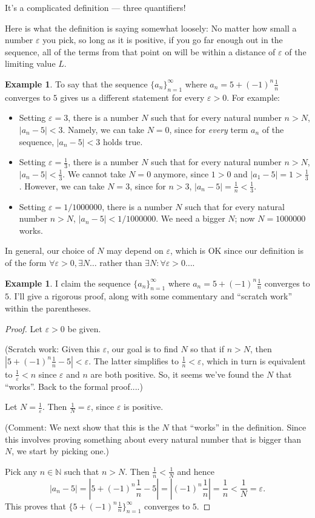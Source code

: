 \documentclass[12pt]{amsart}
\def\e{\varepsilon}
\newcommand{\N}{\mathbb{N}}
\numberwithin{equation}{section}
\theoremstyle{plain} %
\theoremstyle{definition}
\newtheorem{ex}[equation]{Example}
\theoremstyle{remark}
\begin{document}
It's a complicated definition --- three quantifiers!


Here is what the definition is saying somewhat loosely: No matter how small a number $\e$ you pick, so long as it is positive, if you go far enough out in the sequence, all of
the terms from that point on will be within a distance of $\e$ of the limiting value $L$.

\begin{ex} To say that the sequence $\{a_n\}_{n=1}^\infty$ where $a_n =  5 + (-1)^n \frac{1}{n}$ converges to $5$ gives us a different statement for every $\e>0$. For example:
\begin{itemize}
\item Setting $\e=3$, there is a number $N$ such that for every natural number $n>N$, $|a_n-5|<3$. Namely, we can take $N=0$, since for \emph{every} term $a_n$ of the sequence, $|a_n-5|<3$ holds true.
\item Setting $\e=\frac13$, there is a number $N$ such that for every natural number $n>N$, $|a_n-5|<\frac13$. We cannot take $N=0$ anymore, since $1>0$ and $|a_1-5|=1>\frac13$. However, we can take $N=3$, since for $n>3$, $|a_n-5|=\frac1n <\frac13$.
\item Setting $\e=1/1000000$, there is a number $N$ such that for every natural number $n>N$, $|a_n-5|<1/1000000$. We need a bigger $N$; now $N=1000000$ works.
\end{itemize}

In general, our choice of $N$ may depend on $\e$, which is OK since our definition is of the form $\forall \e>0,\exists N\dots$ rather than $\exists N:\forall \e>0\dots$.
\end{ex}



\begin{ex} I claim the sequence $\{a_n\}_{n=1}^\infty$ where $a_n =  5 + (-1)^n \frac{1}{n}$ converges to $5$. I'll give a rigorous proof, along with some commentary and
  ``scratch work'' within the parentheses. 

\begin{proof} Let $\e > 0$ be given. 

(Scratch work: Given this $\e$, our goal is to find $N$ so that if $n > N$, then 
$|5 + (-1)^n \frac{1}{n} - 5| < \e$. The latter simplifies to
$\frac{1}{n} < \e$, which in turn is equivalent to $\frac{1}{\e} < n$ since
$\e$ and $n$ are both positive.  So, it seems we've found the $N$ that
``works''. Back to the formal proof....)


Let $N = \frac{1}{\e}$. Then $\frac{1}{N}
= \e$, since $\e$ is positive.  

(Comment: We next show that this is the $N$ that ``works'' in
the definition. Since this involves proving something about every natural number that is bigger than $N$, 
we start by picking one.) 

Pick any $n \in \N$ such that  $n >
N$. Then $\frac{1}{n} < \frac{1}{N}$ and hence
$$
|a_n - 5| = |5 + (-1)^n \frac{1}{n} - 5| = 
|(-1)^n \frac{1}{n}| = \frac{1}{n} < \frac{1}{N} = \e.
$$
This proves that 
$\{5 + (-1)^n \frac{1}{n}\}_{n=1}^\infty$ converges to $5$.
\end{proof}
\end{ex}
\end{document}
